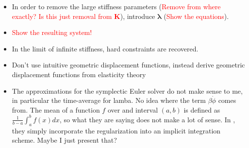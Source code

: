 \documentclass{article}
\begin{document}
\begin{itemize}
    \item In order to remove the large stiffness parameters (\textcolor{red}{Remove from where exactly? Is this just removal from $\bm{K}$}), 
        introduce $\bm{\lambda}$ (\textcolor{red}{Show the equations}).
    \item \textcolor{red}{Show the resulting system!}
    \item In the limit of infinite stiffness, hard constraints are recovered.
    \item Don't use intuitive geometric displacement functions, instead derive geometric displacement functions from elasticity theory
    \item The approximations for the symplectic Euler solver do not make sense to me, in particular the time-average for lamba. No idea
        where the term $\beta \dot{\phi}$ comes from. The mean of a function $f$ over and interval $(a, b)$ is defined as $\frac{1}{b-a}
        \int_a^b f(x) dx$, so what they are saying does not make a lot of sense. In \cite{tournier2015}, they simply incorporate the regularization into
        an implicit integration scheme. Maybe I just present that?
\end{itemize}




\end{document}
